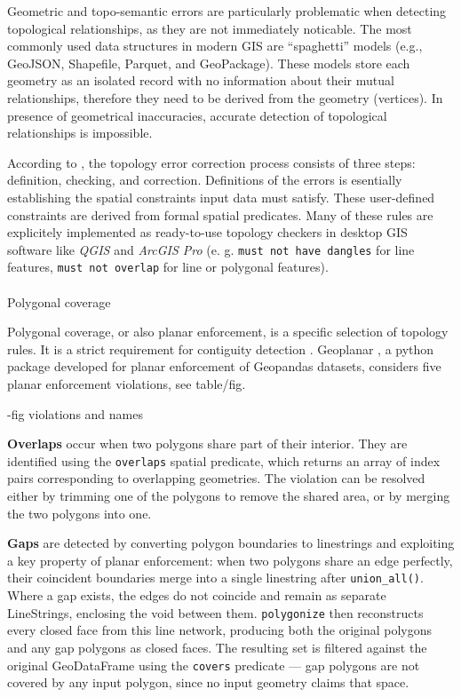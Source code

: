 \documentclass[
  english,
  12pt,
  a4paper,
]{article}
\makeatletter
\let\oldparagraph\paragraph
\renewcommand{\paragraph}{
    \@ifstar
      \xxxParagraphStar
      \xxxParagraphNoStar
  }
\newcommand{\xxxParagraphStar}[1]{\oldparagraph*{#1}\mbox{}}
\newcommand{\xxxParagraphNoStar}[1]{\oldparagraph{#1}\mbox{}}
\makeatother
\begin{document}
Geometric and topo-semantic errors are particularly problematic when
detecting topological relationships, as they are not immediately
noticable. The most commonly used data structures in modern GIS are
``spaghetti'' models (e.g., GeoJSON, Shapefile, Parquet, and
GeoPackage). These models store each geometry as an isolated record with
no information about their mutual relationships, therefore they need to
be derived from the geometry (vertices). In presence of geometrical
inaccuracies, accurate detection of topological relationships is
impossible.

According to \citet{ubedaTopologicalErrorCorrecting1997a}, the topology
error correction process consists of three steps: definition, checking,
and correction. Definitions of the errors is esentially establishing the
spatial constraints input data must satisfy. These user-defined
constraints are derived from formal spatial predicates. Many of these
rules are explicitely implemented as ready-to-use topology checkers in
desktop GIS software like \emph{QGIS} and \emph{ArcGIS Pro} (e. g.
\texttt{must\ not\ have\ dangles} for line features,
\texttt{must\ not\ overlap} for line or polygonal features).

\paragraph{Polygonal coverage}\label{polygonal-coverage}

Polygonal coverage, or also planar enforcement, is a specific selection
of topology rules. It is a strict requirement for contiguity detection
\citep{rey2022PySAL}. Geoplanar \citep{geopanda2026}, a python package
developed for planar enforcement of Geopandas datasets, considers five
planar enforcement violations, see table/fig.

-fig violations and names

\textbf{Overlaps} occur when two polygons share part of their interior.
They are identified using the \texttt{overlaps} spatial predicate, which
returns an array of index pairs corresponding to overlapping geometries.
The violation can be resolved either by trimming one of the polygons to
remove the shared area, or by merging the two polygons into one.

\textbf{Gaps} are detected by converting polygon boundaries to
linestrings and exploiting a key property of planar enforcement: when
two polygons share an edge perfectly, their coincident boundaries merge
into a single linestring after \texttt{union\_all()}. Where a gap
exists, the edges do not coincide and remain as separate LineStrings,
enclosing the void between them. \texttt{polygonize} then reconstructs
every closed face from this line network, producing both the original
polygons and any gap polygons as closed faces. The resulting set is
filtered against the original GeoDataFrame using the \texttt{covers}
predicate --- gap polygons are not covered by any input polygon, since
no input geometry claims that space.
\end{document}

